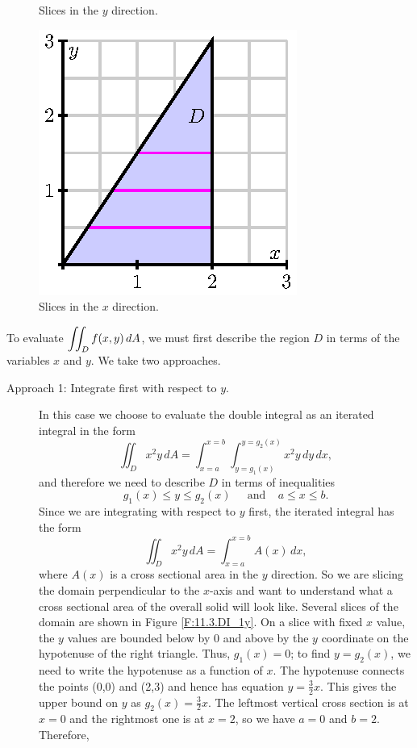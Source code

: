 \begin{example}
\begin{figure}[h]
\begin{center}
\begin{minipage}{1.75in}
\begin{center}
\end{center}
\caption{Slices in the $y$ direction.}
\label{F:11.3.DI_1y}
\end{minipage}
\hspace{0.2in}
\begin{minipage}{1.75in}
\begin{center}
  \includegraphics{figures/fig_11_3_triangular_h.eps}
\end{center}
\caption{Slices in the $x$ direction.}
\label{F:11.3.DI_1x}
\end{minipage}
\end{center}
\end{figure}
To evaluate $\displaystyle \iint_D f(x,y) \, dA$, we must first describe the region $D$ in terms of the variables $x$ and $y$. We take two approaches.
\begin{description}
\item[Approach 1: Integrate first with respect to $y$.] In this case we choose to evaluate the double integral as an iterated integral in the form
\[\iint_D x^2y \, dA = \int_{x=a}^{x=b} \int_{y=g_1(x)}^{y=g_2(x)} x^2y \, dy \, dx,\]
and therefore we need to describe $D$ in terms of inequalities
\[g_1(x) \leq y \leq g_2(x) \ \ \ \ \ \text{ and} \ \ \ \ \ a \leq x \leq b.\]
Since we are integrating with respect to $y$ first, the iterated integral has the form
\[ \iint_D x^2y \, dA =\int_{x=a}^{x=b} A(x) \, dx,\]
where $A(x)$ is a cross sectional area in the $y$ direction. So we are slicing the domain perpendicular to the $x$-axis and want to understand what a cross sectional area of the overall solid will look like. Several slices of the domain are shown in Figure \ref{F:11.3.DI_1y}. On a slice with fixed $x$ value, the $y$ values are bounded below by 0 and above by the $y$ coordinate on the hypotenuse of the right triangle. Thus, $g_1(x) = 0$;  to find $y = g_2(x)$, we need to write the hypotenuse as a function of $x$. The hypotenuse connects the points (0,0) and (2,3) and hence has equation $y = \frac{3}{2}x$. This gives the upper bound on $y$ as $g_2(x) = \frac{3}{2}x$. The leftmost vertical cross section is at $x=0$ and the rightmost one is at $x=2$, so we have $a=0$ and $b=2$. Therefore,

\end{description}
\end{example}

